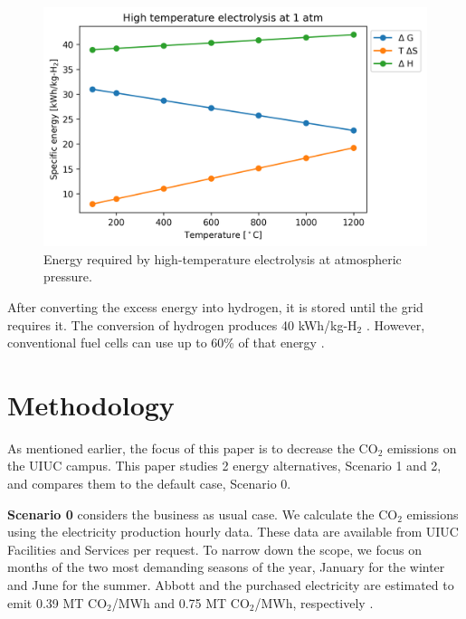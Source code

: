 \documentclass{anstrans}
\begin{document}
\begin{figure}[htbp!] %
    \centering
    \includegraphics[width=0.90\linewidth]{figures/hte-energy}
    \hfill
    \caption{Energy required by high-temperature electrolysis at atmospheric pressure.}
    \label{fig:hte-energy}
\end{figure}

After converting the excess energy into hydrogen, it is stored until the grid requires it.
The conversion of hydrogen produces 40 kWh/kg-H$_2$ \cite{ursua_hydrogen_2012}.
However, conventional fuel cells can use up to 60\% of that energy \cite{doe_energy_fuel_2015}.



\section{Methodology}

As mentioned earlier, the focus of this paper is to decrease the CO$_2$ emissions on the UIUC campus.
This paper studies 2 energy alternatives, Scenario 1 and 2, and compares them to the default case, Scenario 0.

\textbf{Scenario 0} considers the business as usual case.
We calculate the CO$_2$ emissions using the electricity production hourly data.
These data are available from UIUC Facilities and Services per request.
To narrow down the scope, we focus on months of the two most demanding seasons of the year, January for the winter and June for the summer.
Abbott and the purchased electricity are estimated to emit 0.39 MT CO$_2$/MWh and 0.75 MT CO$_2$/MWh, respectively \cite{isee_illinois_2015, isee_illinois_2020}.
\end{document}
